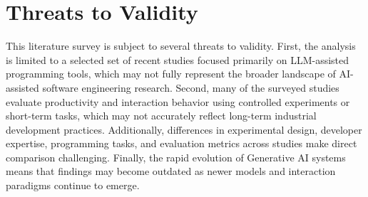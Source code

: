\section{Threats to Validity}
This literature survey is subject to several threats to validity. First, the analysis is limited to a selected set of recent studies focused primarily on LLM-assisted programming tools, which may not fully represent the broader landscape of AI-assisted software engineering research. Second, many of the surveyed studies evaluate productivity and interaction behavior using controlled experiments or short-term tasks, which may not accurately reflect long-term industrial development practices. Additionally, differences in experimental design, developer expertise, programming tasks, and evaluation metrics across studies make direct comparison challenging. Finally, the rapid evolution of Generative AI systems means that findings may become outdated as newer models and interaction paradigms continue to emerge.